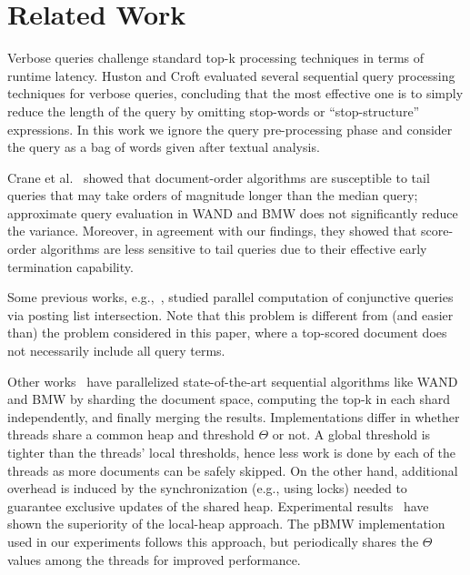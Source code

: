 \section{Related Work}
\label{sec:related}

Verbose queries challenge standard top-k processing techniques in terms of runtime latency. Huston and Croft \cite{Huston:2010} evaluated several sequential query processing techniques for verbose queries, concluding that the most effective one is to simply reduce the length of the query by omitting stop-words or ``stop-structure'' expressions. 
In this work we ignore the query pre-processing phase and consider the query as a bag of words given after textual analysis.

Crane et al.~\cite{Crane:2017} showed that  document-order algorithms 
are susceptible to tail queries that may take orders of magnitude longer than the median query; approximate query evaluation in WAND and BMW does not significantly reduce the variance. Moreover, in agreement with our findings, they showed that score-order algorithms  are less sensitive to tail queries due to their effective early termination capability. 



Some previous works,  e.g.,~\cite{Tatikonda:2011,Liu:2018:GUC:3178487.3178512}, studied parallel computation  of conjunctive queries  via posting list intersection. 
Note that this problem is different from (and easier than) the problem considered in this paper, where a top-scored document does not necessarily include all query terms. 

Other works~\cite{Bonacic:2010,rojas2013efficient} have parallelized state-of-the-art sequential algorithms like WAND and BMW  by sharding the document space, computing the top-k in each shard independently, and finally merging the results.  Implementations differ in whether threads share a common  
heap and  threshold $\Theta$ or not. A global threshold is  tighter than the threads' local thresholds, hence  less work is done by each of the threads as  more documents can be safely skipped. 
On the other hand, additional overhead is induced by the synchronization (e.g., using locks) needed to guarantee exclusive updates of the shared heap. 
Experimental results~\cite{rojas2013efficient} have shown the superiority of the local-heap approach. The pBMW implementation used in our experiments follows this approach,
but periodically shares the  $\Theta$ values among the threads for improved performance.

